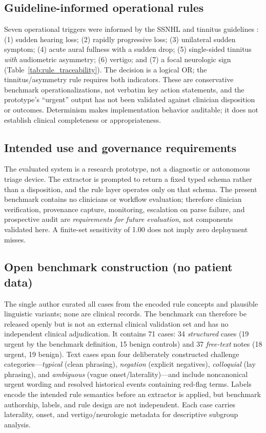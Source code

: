 \documentclass[11pt]{article}
\begin{document}
\subsection{Guideline-informed operational rules}
Seven operational triggers were informed by the SSNHL and tinnitus guidelines \cite{chandrasekhar2019ssnhl,tunkel2014cpg}: (1) sudden hearing loss; (2) rapidly progressive loss; (3) unilateral sudden symptom; (4) acute aural fullness with a sudden drop; (5) single-sided tinnitus \emph{with} audiometric asymmetry; (6) vertigo; and (7) a focal neurologic sign (Table~\ref{tab:rule_traceability}). The decision is a logical OR; the tinnitus/asymmetry rule requires both indicators. These are conservative benchmark operationalizations, not verbatim key action statements, and the prototype's ``urgent'' output has not been validated against clinician disposition or outcomes. Determinism makes implementation behavior auditable; it does not establish clinical completeness or appropriateness.



\subsection{Intended use and governance requirements}
The evaluated system is a research prototype, not a diagnostic or autonomous triage device. The extractor is prompted to return a fixed typed schema rather than a disposition, and the rule layer operates only on that schema. The present benchmark contains no clinicians or workflow evaluation; therefore clinician verification, provenance capture, monitoring, escalation on parse failure, and prospective audit are \emph{requirements for future evaluation}, not components validated here. A finite-set sensitivity of 1.00 does not imply zero deployment misses.

\subsection{Open benchmark construction (no patient data)}
The single author curated all cases from the encoded rule concepts and plausible linguistic variants; none are clinical records. The benchmark can therefore be released openly but is not an external clinical validation set and has no independent clinical adjudication. It contains 71 cases: 34 \emph{structured} cases (19 urgent by the benchmark definition, 15 benign controls) and 37 \emph{free-text} notes (18 urgent, 19 benign). Text cases span four deliberately constructed challenge categories---\emph{typical} (clean phrasing), \emph{negation} (explicit negatives), \emph{colloquial} (lay phrasing), and \emph{ambiguous} (vague onset/laterality)---and include noncanonical urgent wording and resolved historical events containing red-flag terms. Labels encode the intended rule semantics before an extractor is applied, but benchmark authorship, labels, and rule design are not independent. Each case carries laterality, onset, and vertigo/neurologic metadata for descriptive subgroup analysis.
\end{document}
